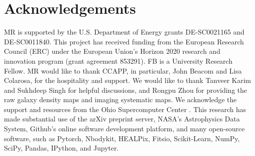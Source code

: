 \section*{Acknowledgements}
MR is supported by the U.S. Department of Energy grants DE-SC0021165 and DE-SC0011840. This project has received funding from the European Research Council (ERC) under the European Union’s Horizon 2020 research and innovation program (grant agreement 853291). FB is a University Research Fellow. MR would like to thank CCAPP, in particular, John Beacom and Lisa Colarosa, for the hospitality and support. We would like to thank Tanveer Karim and Sukhdeep Singh for helpful discussions, and Rongpu Zhou for providing the raw galaxy density maps and imaging systematic maps. We acknowledge the support and resources from the Ohio Supercomputer Center \citep[OSC;][]{OhioSupercomputerCenter1987}. This research has made substantial use of the arXiv preprint server, NASA’s Astrophysics Data System, Github's online software development platform, and many open-source software, such as Pytorch, Nbodykit, HEALPix, Fitsio, Scikit-Learn, NumPy, SciPy, Pandas, IPython, and Jupyter. 


